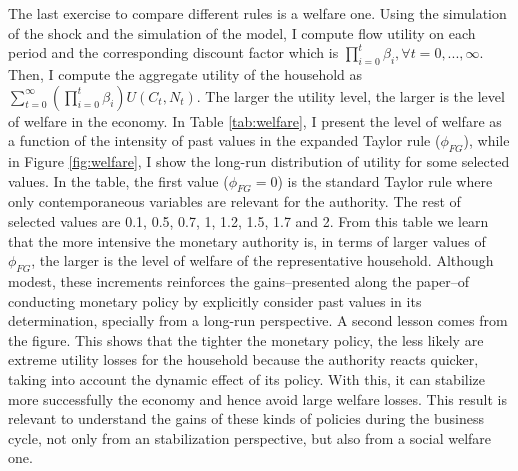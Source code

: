 \documentclass[12pt]{article}
\numberwithin{equation}{section}
\begin{document}
The last exercise to compare different rules is a welfare one. Using the simulation of the shock and the simulation of the model, I compute flow utility on each period and the corresponding discount factor which is $\prod_{i=0}^t\beta_i, \forall t=0,...,\infty$. Then, I compute the aggregate utility of the household as $\sum_{t=0}^{\infty}(\prod_{i=0}^t\beta_i)U(C_t,N_t)$. The larger the utility level, the larger is the level of welfare in the economy. In Table \ref{tab:welfare}, I present the level of welfare as a function of the intensity of past values in the expanded Taylor rule ($\phi_{FG}$), while in Figure \ref{fig:welfare}, I show the long-run distribution of utility for some selected values. In the table, the first value ($\phi_{FG}=0$) is the standard Taylor rule where only contemporaneous variables are relevant for the authority. The rest of selected values are 0.1, 0.5, 0.7, 1, 1.2, 1.5, 1.7 and 2. From this table we learn that the more intensive the monetary authority is, in terms of larger values of $\phi_{FG}$, the larger is the level of welfare of the representative household. Although modest, these increments reinforces the gains--presented along the paper--of conducting monetary policy by explicitly consider past values in its determination, specially from a long-run perspective. A second lesson comes from the figure. This shows that the tighter the monetary policy, the less likely are extreme utility losses for the household because the authority reacts quicker, taking into account the dynamic effect of its policy. With this, it can stabilize more successfully the economy and hence avoid large welfare losses. This result is relevant to understand the gains of these kinds of policies during the business cycle, not only from an stabilization perspective, but also from a social welfare one.



\end{document}
